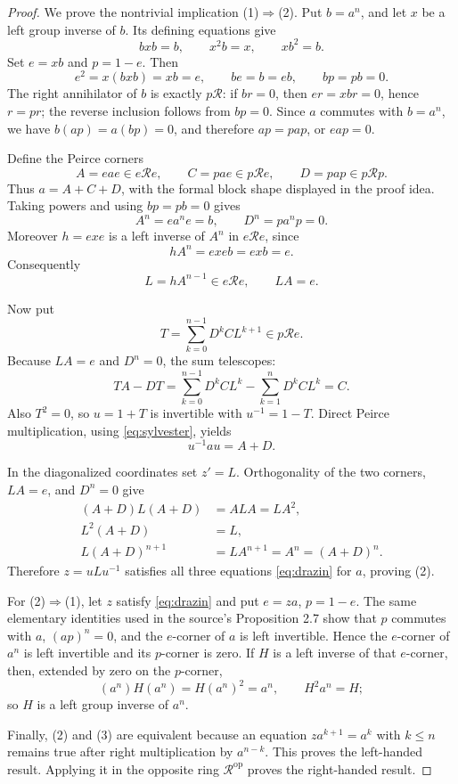 \documentclass[11pt]{article}
\newcommand{\R}{\mathcal R}
\begin{document}
\begin{proof}
We prove the nontrivial implication (1)\(\Rightarrow\)(2).  Put \(b=a^n\),
and let \(x\) be a left group inverse of \(b\).  Its defining equations give
\[
 bxb=b,\qquad x^2b=x,\qquad xb^2=b.
\]
Set \(e=xb\) and \(p=1-e\).  Then
\[
 e^2=x(bxb)=xb=e,\qquad be=b=eb,\qquad bp=pb=0.
\]
The right annihilator of \(b\) is exactly \(p\R\): if \(br=0\), then
\(er=xbr=0\), hence \(r=pr\); the reverse inclusion follows from \(bp=0\).
Since \(a\) commutes with \(b=a^n\), we have
\(b(ap)=a(bp)=0\), and therefore \(ap=pap\), or \(eap=0\).

Define the Peirce corners
\[
 A=eae\in e\R e,\qquad C=pae\in p\R e,\qquad D=pap\in p\R p.
\]
Thus \(a=A+C+D\), with the formal block shape displayed in the proof idea.
Taking powers and using \(bp=pb=0\) gives
\begin{equation}\label{eq:diagdata}
 A^n=ea^ne=b,\qquad D^n=pa^np=0.
\end{equation}
Moreover \(h=exe\) is a left inverse of \(A^n\) in \(e\R e\), since
\[
 hA^n=exe b=exb=e.
\]
Consequently
\[
 L=hA^{n-1}\in e\R e,\qquad LA=e.
\]

Now put
\begin{equation}\label{eq:T}
 T=\sum_{k=0}^{n-1}D^kCL^{k+1}\in p\R e.
\end{equation}
Because \(LA=e\) and \(D^n=0\), the sum telescopes:
\begin{equation}\label{eq:sylvester}
 TA-DT
 =\sum_{k=0}^{n-1}D^kCL^k-
   \sum_{k=1}^{n}D^kCL^k=C.
\end{equation}
Also \(T^2=0\), so \(u=1+T\) is invertible with \(u^{-1}=1-T\).  Direct
Peirce multiplication, using \eqref{eq:sylvester}, yields
\begin{equation}\label{eq:similarity}
 u^{-1}au=A+D.
\end{equation}

In the diagonalized coordinates set \(z'=L\).  Orthogonality of the two
corners, \(LA=e\), and \(D^n=0\) give
\begin{align*}
 (A+D)L(A+D)&=ALA=LA^2,\\
 L^2(A+D)&=L,\\
 L(A+D)^{n+1}&=LA^{n+1}=A^n=(A+D)^n.
\end{align*}
Therefore \(z=uLu^{-1}\) satisfies all three equations
\eqref{eq:drazin} for \(a\), proving (2).

For (2)\(\Rightarrow\)(1), let \(z\) satisfy \eqref{eq:drazin} and put
\(e=za\), \(p=1-e\).  The same elementary identities used in the source's
Proposition 2.7 show that \(p\) commutes with \(a\), \((ap)^n=0\), and the
\(e\)-corner of \(a\) is left invertible.  Hence the \(e\)-corner of \(a^n\)
is left invertible and its \(p\)-corner is zero.  If \(H\) is a left inverse
of that \(e\)-corner, then, extended by zero on the \(p\)-corner,
\[
 (a^n)H(a^n)=H(a^n)^2=a^n,\qquad H^2a^n=H;
\]
so \(H\) is a left group inverse of \(a^n\).

Finally, (2) and (3) are equivalent because an equation
\(za^{k+1}=a^k\) with \(k\leq n\) remains true after right multiplication by
\(a^{n-k}\).  This proves the left-handed result.  Applying it in the
opposite ring \(\R^{\mathrm{op}}\) proves the right-handed result.
\end{proof}
\end{document}

